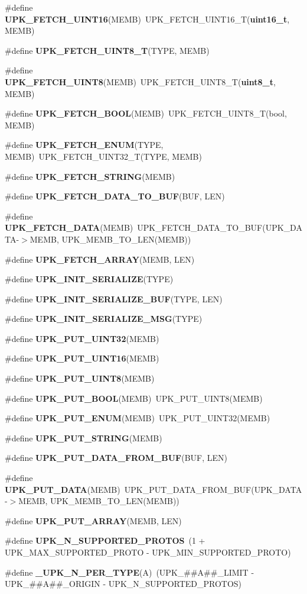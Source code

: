 \begin{DoxyCompactItemize}
\#define {\bf UPK\_\-FETCH\_\-UINT16}(MEMB)~UPK\_\-FETCH\_\-UINT16\_\-T({\bf uint16\_\-t}, MEMB)
\item 
\#define {\bf UPK\_\-FETCH\_\-UINT8\_\-T}(TYPE, MEMB)
\item 
\#define {\bf UPK\_\-FETCH\_\-UINT8}(MEMB)~UPK\_\-FETCH\_\-UINT8\_\-T({\bf uint8\_\-t}, MEMB)
\item 
\#define {\bf UPK\_\-FETCH\_\-BOOL}(MEMB)~UPK\_\-FETCH\_\-UINT8\_\-T(bool, MEMB)
\item 
\#define {\bf UPK\_\-FETCH\_\-ENUM}(TYPE, MEMB)~UPK\_\-FETCH\_\-UINT32\_\-T(TYPE, MEMB)
\item 
\#define {\bf UPK\_\-FETCH\_\-STRING}(MEMB)
\item 
\#define {\bf UPK\_\-FETCH\_\-DATA\_\-TO\_\-BUF}(BUF, LEN)
\item 
\#define {\bf UPK\_\-FETCH\_\-DATA}(MEMB)~UPK\_\-FETCH\_\-DATA\_\-TO\_\-BUF(UPK\_\-DATA-\/$>$MEMB, UPK\_\-MEMB\_\-TO\_\-LEN(MEMB))
\item 
\#define {\bf UPK\_\-FETCH\_\-ARRAY}(MEMB, LEN)
\item 
\#define {\bf UPK\_\-INIT\_\-SERIALIZE}(TYPE)
\item 
\#define {\bf UPK\_\-INIT\_\-SERIALIZE\_\-BUF}(TYPE, LEN)
\item 
\#define {\bf UPK\_\-INIT\_\-SERIALIZE\_\-MSG}(TYPE)
\item 
\#define {\bf UPK\_\-PUT\_\-UINT32}(MEMB)
\item 
\#define {\bf UPK\_\-PUT\_\-UINT16}(MEMB)
\item 
\#define {\bf UPK\_\-PUT\_\-UINT8}(MEMB)
\item 
\#define {\bf UPK\_\-PUT\_\-BOOL}(MEMB)~UPK\_\-PUT\_\-UINT8(MEMB)
\item 
\#define {\bf UPK\_\-PUT\_\-ENUM}(MEMB)~UPK\_\-PUT\_\-UINT32(MEMB)
\item 
\#define {\bf UPK\_\-PUT\_\-STRING}(MEMB)
\item 
\#define {\bf UPK\_\-PUT\_\-DATA\_\-FROM\_\-BUF}(BUF, LEN)
\item 
\#define {\bf UPK\_\-PUT\_\-DATA}(MEMB)~UPK\_\-PUT\_\-DATA\_\-FROM\_\-BUF(UPK\_\-DATA-\/$>$MEMB, UPK\_\-MEMB\_\-TO\_\-LEN(MEMB))
\item 
\#define {\bf UPK\_\-PUT\_\-ARRAY}(MEMB, LEN)
\item 
\#define {\bf UPK\_\-N\_\-SUPPORTED\_\-PROTOS}~(1 + UPK\_\-MAX\_\-SUPPORTED\_\-PROTO -\/ UPK\_\-MIN\_\-SUPPORTED\_\-PROTO)
\item 
\#define {\bf \_\-UPK\_\-N\_\-PER\_\-TYPE}(A)~(UPK\_\-\#\#A\#\#\_\-LIMIT -\/ UPK\_\-\#\#A\#\#\_\-ORIGIN -\/ UPK\_\-N\_\-SUPPORTED\_\-PROTOS)

\end{DoxyCompactItemize}
